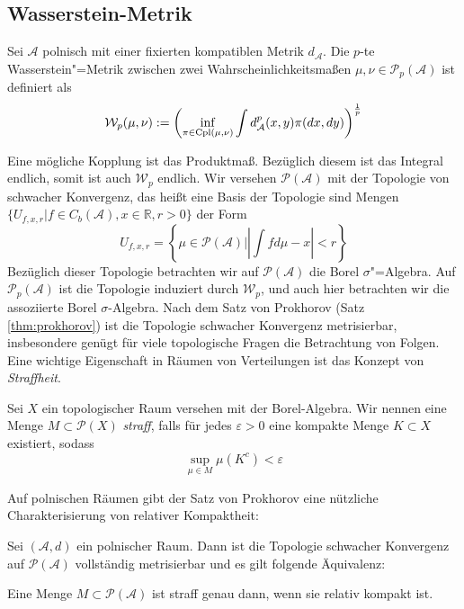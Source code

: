 \subsection{Wasserstein-Metrik}
\begin{definition}\label{def:wasserstein_distance}
    Sei $\mathcal{A}$ polnisch mit einer fixierten kompatiblen Metrik $d_\mathcal{A}$. Die $p$-te Wasserstein"=Metrik zwischen zwei Wahrscheinlichkeitsmaßen $\mu, \nu \in \mathcal{P}_p(\mathcal{A})$ ist definiert als
    $$\mathcal{W}_p(\mu, \nu) := \left( \inf_{\pi \in \operatorname{Cpl}(\mu, \nu)} \int d^p_\mathcal{A}(x, y) \pi(dx, dy) \right)^\frac{1}{p}$$
\end{definition}
Eine mögliche Kopplung ist das Produktmaß. Bezüglich diesem ist das Integral endlich, somit ist auch $\mathcal{W}_p$ endlich. Wir versehen $\mathcal{P}(\mathcal{A})$ mit der Topologie von schwacher Konvergenz, das heißt eine Basis der Topologie sind Mengen $\{U_{f, x, r} \vert f \in C_b(\mathcal{A}), x\in \mathbb{R}, r>0\}$ der Form 
$$U_{f, x, r} = \left\{ \mu \in \mathcal{P}(\mathcal{A}) \vert \left| \int f d\mu - x\right| < r\right\}$$
Bezüglich dieser Topologie betrachten wir auf $\mathcal{P}(\mathcal{A})$ die Borel $\sigma$"=Algebra. Auf $\mathcal{P}_p(\mathcal{A})$ ist die Topologie induziert durch $\mathcal{W}_p$, und auch hier betrachten wir die assoziierte Borel $\sigma$-Algebra. Nach dem Satz von Prokhorov (Satz \ref{thm:prokhorov}) ist die Topologie schwacher Konvergenz metrisierbar, insbesondere genügt für viele topologische Fragen die Betrachtung von Folgen. \\

Eine wichtige Eigenschaft in Räumen von Verteilungen ist das Konzept von \emph{Straffheit}. 
\begin{definition}
    Sei $X$ ein topologischer Raum versehen mit der Borel-Algebra. Wir nennen eine Menge $M\subset \mathcal{P}(X)$ \emph{straff}, falls für jedes $\varepsilon>0$ eine kompakte Menge $K\subset X$ existiert, sodass 
    $$\sup_{\mu \in M} \mu(K^c) < \varepsilon$$
\end{definition}
 Auf polnischen Räumen gibt der Satz von Prokhorov eine nützliche Charakterisierung von relativer Kompaktheit:

\begin{theorem}\label{thm:prokhorov}
Sei $(\mathcal{A}, d)$ ein polnischer Raum. Dann ist die Topologie schwacher Konvergenz auf $\mathcal{P}(\mathcal{A})$ vollständig metrisierbar und es gilt folgende Äquivalenz:

Eine Menge $M \subset \mathcal{P}(\mathcal{A})$ ist straff genau dann, wenn sie relativ kompakt ist.
\end{theorem}

